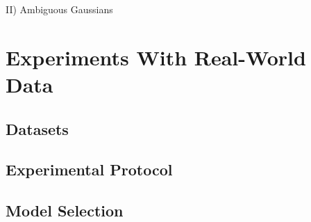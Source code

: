 II) Ambiguous Gaussians %

\section{Experiments With Real-World Data}
\subsection{Datasets}
\subsection{Experimental Protocol}
\subsection{Model Selection}

